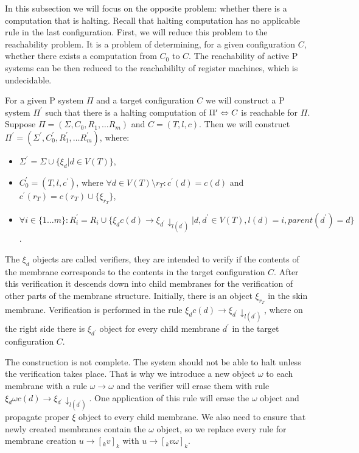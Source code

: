 In this subsection we will focus on the opposite problem: whether there is a computation that is halting. Recall that halting computation has no applicable rule in the last configuration.
First, we will reduce this problem to the reachability problem. It is a problem of determining, for a given configuration $C$, whether there exists a computation from $C_0$ to $C$. The reachability of active P systems can be then reduced to the reachabililty of register machines, which is undecidable.

For a given P system $\Pi$ and a target configuration $C$ we will construct a P system $\Pi^\prime$ such that there is a halting computation of $\Pi^\prime\Leftrightarrow\linebreak C$ is reachable for $\Pi$. Suppose $\Pi = (\Sigma, C_0, R_1, \ldots R_m)$ and $C = (T, l, c)$. Then we will construct $\Pi^\prime = (\Sigma^\prime, C_0^\prime, R_1^\prime, \ldots R_m^\prime)$, where:

\begin{itemize}
  \item $\Sigma^\prime = \Sigma\cup\{\xi_d|d\in V(T)\}$,
  \item $C_0^\prime = (T, l, c^\prime)$, where $\forall d\in V(T)\setminus r_T: c^\prime(d) = c(d)$ and $c^\prime(r_T) = c(r_T)\cup\{\xi_{r_T}\}$,
  \item $\forall i\in\{1\ldots m\}: R_i^\prime = R_i\cup\{\xi_d c(d)\rightarrow\xi_{d^\prime}\downarrow_{l(d^\prime)}|d,d^\prime\in V(T),l(d)=i,parent(d^\prime)=d\}$.
\end{itemize}

The $\xi_d$ objects are called verifiers, they are intended to verify if the contents of the membrane corresponds to the contents in the target configuration $C$. After this verification it descends down into child membranes for the verification of other parts of the membrane structure.
Initially, there is an object $\xi_{r_T}$ in the skin membrane. Verification is performed in the rule $\xi_d c(d)\rightarrow\xi_{d^\prime}\downarrow_{l(d^\prime)}$, where on the right side there is $\xi_{d^\prime}$ object for every child membrane $d^\prime$ in the target configuration $C$.

The construction is not complete. The system should not be able to halt unless the verification takes place. That is why we introduce a new object $\omega$ to each membrane with a rule $\omega\rightarrow\omega$ and the verifier will erase them with rule $\xi_d\omega c(d)\rightarrow\xi_{d^\prime}\downarrow_{l(d^\prime)}$. One application of this rule will erase the $\omega$ object and propagate proper $\xi$ object to every child membrane. We also need to ensure that newly created membranes contain the $\omega$ object, so we replace every rule for membrane creation $u\rightarrow [_k v]_k$ with $u\rightarrow [_k v\omega]_k$.

